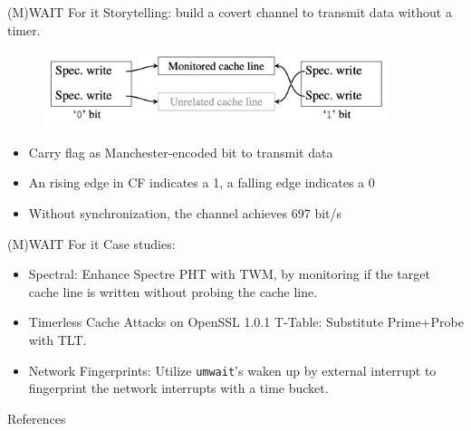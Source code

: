 \documentclass{beamer}
\begin{document}
\begin{frame}{(M)WAIT For it\cite{mwait}}
Storytelling: build a covert channel to transmit data without a timer.
\begin{figure}
    \begin{center}
    \includegraphics[width=0.9\textwidth]{img/covert.png}
    \end{center}
\end{figure}
\begin{itemize}[<+->]
    \item Carry flag as Manchester-encoded bit to transmit data
    \item An rising edge in CF indicates a 1, a falling edge indicates a 0
    \item Without synchronization, the channel achieves 697 bit/s
\end{itemize}
\end{frame}

\begin{frame}{(M)WAIT For it\cite{mwait}}
Case studies:
\begin{itemize}[<+->]
    \item Spectral: Enhance Spectre PHT with TWM, by monitoring if the target cache line is written without probing the cache line.
    \item Timerless Cache Attacks on OpenSSL 1.0.1 T-Table: Substitute Prime+Probe with TLT.
    \item Network Fingerprints: Utilize \texttt{umwait}'s waken up by external interrupt to fingerprint the network interrupts with a time bucket.
\end{itemize}
\end{frame}

\begin{frame}[allowframebreaks]{References}
\tiny
\printbibliography
\end{frame}
\end{document}
